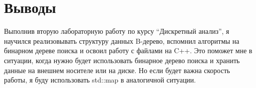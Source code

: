 \section{Выводы}
{\itshape }

Выполнив вторую лабораторную работу по курсу \enquote{Дискретный анализ}, я научился реализовывать структуру данных B-дерево, 
вспомнил алгоритмы на бинарном дереве поиска и освоил работу с файлами на C++. Это поможет мне в ситуации, когда нужно будет 
использовать бинарное дерево поиска и хранить данные на внешнем носителе или на диске. Но если будет важна скорость работы, 
я буду использовать std::map в аналогичной ситуации.
\pagebreak
